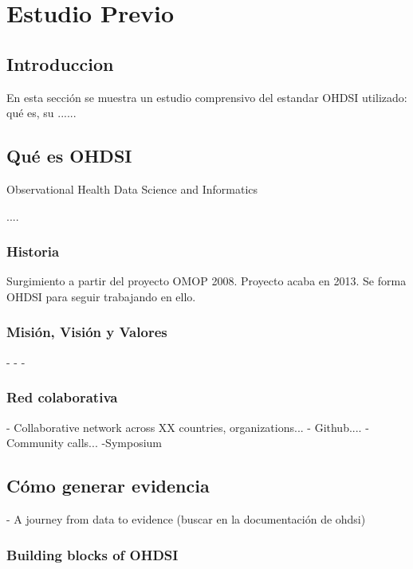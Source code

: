 \chapter{Estudio Previo}\label{cap:05EstudioPrevio}

\section{Introduccion}

En esta sección se muestra un estudio comprensivo del estandar OHDSI utilizado: qué es, su ......

\section{Qué es OHDSI}

Observational Health Data Science and Informatics

....

\subsection{Historia}

Surgimiento a partir del proyecto OMOP 2008. Proyecto acaba en 2013. Se forma OHDSI para seguir trabajando en ello.

\subsection{Misión, Visión y Valores}

-
-
-

\subsection{Red colaborativa}

- Collaborative network across XX countries, organizations...
- Github....
- Community calls...
-Symposium

\section{Cómo generar evidencia}

- A journey from data to evidence (buscar en la documentación de ohdsi)

\subsection{Building blocks of OHDSI}

